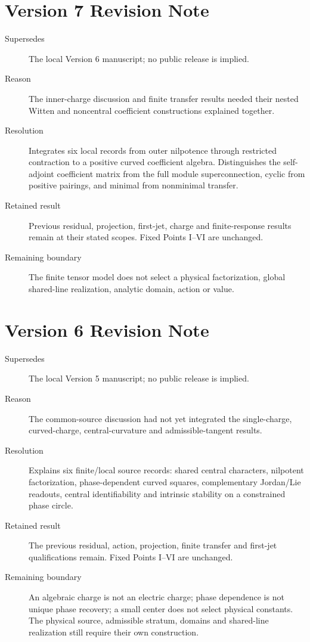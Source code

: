 \documentclass[11pt,a4paper]{article}
\begin{document}
\section*{Version 7 Revision Note}
\begin{description}
\item[Supersedes] The local Version 6 manuscript; no public release is implied.
\item[Reason] The inner-charge discussion and finite transfer results needed
their nested Witten and noncentral coefficient constructions explained together.
\item[Resolution] Integrates six local records from outer nilpotence through
restricted contraction to a positive curved coefficient algebra. Distinguishes
the self-adjoint coefficient matrix from the full module superconnection,
cyclic from positive pairings, and minimal from nonminimal transfer.
\item[Retained result] Previous residual, projection, first-jet, charge and
finite-response results remain at their stated scopes. Fixed Points I--VI
are unchanged.
\item[Remaining boundary] The finite tensor model does not select a physical
factorization, global shared-line realization, analytic domain, action or value.
\end{description}

\section*{Version 6 Revision Note}
\begin{description}
\item[Supersedes] The local Version 5 manuscript; no public release is implied.
\item[Reason] The common-source discussion had not yet integrated the
single-charge, curved-charge, central-curvature and admissible-tangent results.
\item[Resolution] Explains six finite/local source records: shared central
characters, nilpotent factorization, phase-dependent curved squares,
complementary Jordan/Lie readouts, central identifiability and intrinsic
stability on a constrained phase circle.
\item[Retained result] The previous residual, action, projection, finite
transfer and first-jet qualifications remain. Fixed Points I--VI are unchanged.
\item[Remaining boundary] An algebraic charge is not an electric charge;
phase dependence is not unique phase recovery; a small center does not select
physical constants. The physical source, admissible stratum, domains and
shared-line realization still require their own construction.
\end{description}
\end{document}
